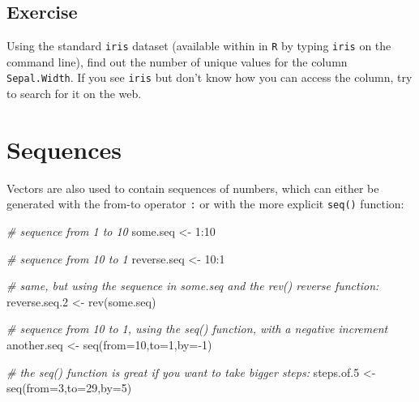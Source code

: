 \documentclass[
]{book}
\newenvironment{Shaded}{\begin{snugshade}}{\end{snugshade}}
\newcommand{\AttributeTok}[1]{\textcolor[rgb]{0.77,0.63,0.00}{#1}}
\newcommand{\CommentTok}[1]{\textcolor[rgb]{0.56,0.35,0.01}{\textit{#1}}}
\newcommand{\DecValTok}[1]{\textcolor[rgb]{0.00,0.00,0.81}{#1}}
\newcommand{\FloatTok}[1]{\textcolor[rgb]{0.00,0.00,0.81}{#1}}
\newcommand{\FunctionTok}[1]{\textcolor[rgb]{0.00,0.00,0.00}{#1}}
\newcommand{\NormalTok}[1]{#1}
\newcommand{\OtherTok}[1]{\textcolor[rgb]{0.56,0.35,0.01}{#1}}
\newcommand{\SpecialCharTok}[1]{\textcolor[rgb]{0.00,0.00,0.00}{#1}}
\begin{document}
\hypertarget{exercise}{%
\subsection{Exercise}\label{exercise}}

Using the standard \texttt{iris} dataset (available within in \texttt{R} by typing \texttt{iris} on the command line), find out the number of unique values for the column \texttt{Sepal.Width}. If you see \texttt{iris} but don't know how you can access the column, try to search for it on the web.

\hypertarget{sequences}{%
\section{Sequences}\label{sequences}}

Vectors are also used to contain sequences of numbers, which can either be generated with the from-to operator \texttt{:} or with the more explicit \texttt{seq()} function:

\begin{Shaded}
\begin{Highlighting}[]
\CommentTok{\# sequence from 1 to 10}
\NormalTok{some.seq }\OtherTok{\textless{}{-}} \DecValTok{1}\SpecialCharTok{:}\DecValTok{10}

\CommentTok{\# sequence from 10 to 1}
\NormalTok{reverse.seq }\OtherTok{\textless{}{-}} \DecValTok{10}\SpecialCharTok{:}\DecValTok{1}

\CommentTok{\# same, but using the sequence in some.seq and the rev() \textquotesingle{}reverse\textquotesingle{} function:}
\NormalTok{reverse.seq}\FloatTok{.2} \OtherTok{\textless{}{-}} \FunctionTok{rev}\NormalTok{(some.seq)}

\CommentTok{\# sequence from 10 to 1, using the seq() function, with a negative increment}
\NormalTok{another.seq }\OtherTok{\textless{}{-}} \FunctionTok{seq}\NormalTok{(}\AttributeTok{from=}\DecValTok{10}\NormalTok{,}\AttributeTok{to=}\DecValTok{1}\NormalTok{,}\AttributeTok{by=}\SpecialCharTok{{-}}\DecValTok{1}\NormalTok{)}

\CommentTok{\# the seq() function is great if you want to take bigger steps:}
\NormalTok{steps.of}\FloatTok{.5} \OtherTok{\textless{}{-}} \FunctionTok{seq}\NormalTok{(}\AttributeTok{from=}\DecValTok{3}\NormalTok{,}\AttributeTok{to=}\DecValTok{29}\NormalTok{,}\AttributeTok{by=}\DecValTok{5}\NormalTok{)}
\end{Highlighting}
\end{Shaded}
\end{document}
